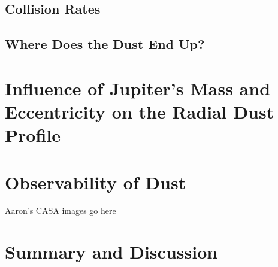 \documentclass[onecolumn]{aastex63}
\begin{document}
\subsection{Collision Rates}\label{sec:coll_rates}

\subsection{Where Does the Dust End Up?}

\section{Influence of Jupiter's Mass and Eccentricity on the Radial Dust Profile}

\section{Observability of Dust} \label{sec:dust}

Aaron's CASA images go here

\section{Summary and Discussion} \label{sec:discuss}



\clearpage
\end{document}
